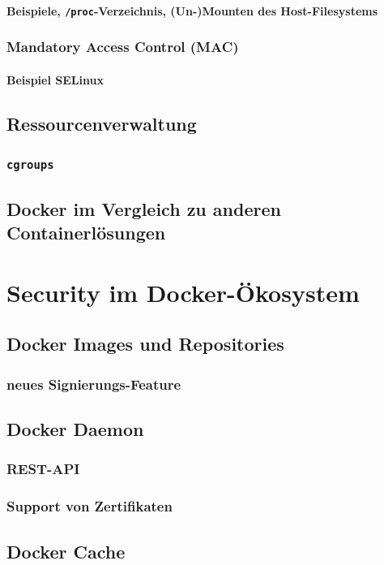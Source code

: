 \documentclass[11pt,a4paper,oneside]{report}
\begin{document}
			\subsubsection{Beispiele, \texttt{/proc}-Verzeichnis, (Un-)Mounten des Host-Filesystems}
		\subsection{Mandatory Access Control (MAC)}
			\subsubsection{Beispiel SELinux}
	\section{Ressourcenverwaltung}
		\subsection{\texttt{cgroups}}
	\section{Docker im Vergleich zu anderen Containerlösungen}
\chapter{Security im Docker-Ökosystem}
  \section{Docker Images und Repositories}
		\subsection{neues Signierungs-Feature}
	\section{Docker Daemon}
		\subsection{REST-API}
		\subsection{Support von Zertifikaten}
	\section{Docker Cache}
\end{document}
